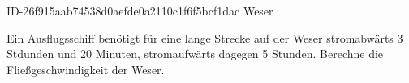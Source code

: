 \begin{exercise}
      {ID-26f915aab74538d0aefde0a2110c1f6f5bcf1dac}
      {Weser}
  \ifproblem\problem\par
    Ein Ausflugsschiff benötigt für eine  lange Strecke auf der Weser
    stromabwärts 3 Stdunden und 20 Minuten, stromaufwärts dagegen 5 Stunden.
    Berechne die Fließgeschwindigkeit der Weser.
  \fi
\end{exercise}

